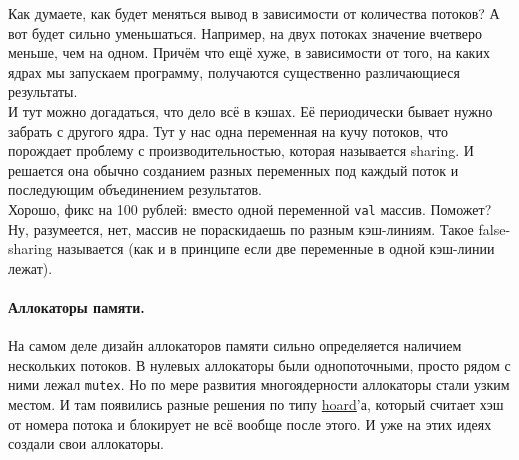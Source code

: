 \documentclass{article}
\begin{document}
    Как думаете, как будет меняться вывод в зависимости от количества потоков? А вот будет сильно уменьшаться. Например, на двух потоках значение вчетверо меньше, чем на одном. Причём что ещё хуже, в зависимости от того, на каких ядрах мы запускаем программу, получаются существенно различающиеся результаты.\\
    И тут можно догадаться, что дело всё в кэшах. Её периодически бывает нужно забрать с другого ядра. Тут у нас одна переменная на кучу потоков, что порождает проблему с производительностью, которая называется sharing. И решается она обычно созданием разных переменных под каждый поток и последующим объединением результатов.\\
    Хорошо, фикс на 100 рублей: вместо одной переменной \texttt{val} массив. Поможет? Ну, разумеется, нет, массив не пораскидаешь по разным кэш-линиям. Такое false-sharing называется (как и в принципе если две переменные в одной кэш-линии лежат).
    \paragraph{Аллокаторы памяти.}
    На самом деле дизайн аллокаторов памяти сильно определяется наличием нескольких потоков. В нулевых аллокаторы были однопоточными, просто рядом с ними лежал \Verb|mutex|. Но по мере развития многоядерности аллокаторы стали узким местом. И там появились разные решения по типу \href{https://people.cs.umass.edu/~emery/pubs/berger-asplos2000.pdf}{hoard}'а, который считает хэш от номера потока и блокирует не всё вообще после этого. И уже на этих идеях создали свои аллокаторы.
\end{document}

